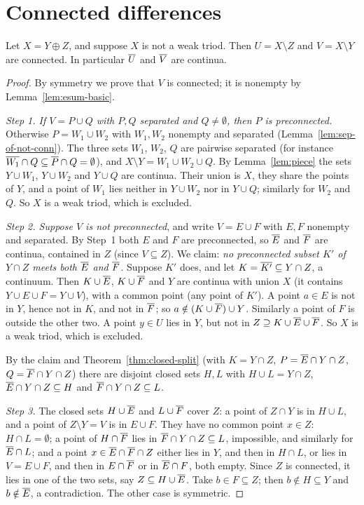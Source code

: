 \section{Connected differences}

\begin{theorem}\label{thm:diff-connected}
Let $X=Y\oplus Z$, and suppose $X$ is not a weak triod. Then $U=X\setminus Z$ and $V=X\setminus Y$ are
connected. In particular $\overline{U}$ and $\overline{V}$ are continua.
\end{theorem}

\begin{proof}
By symmetry we prove that $V$ is connected; it is nonempty by Lemma~\ref{lem:esum-basic}.

\emph{Step 1. If $V=P\cup Q$ with $P,Q$ separated and $Q\neq\emptyset$, then $P$ is preconnected.}
Otherwise $P=W_1\cup W_2$ with $W_1,W_2$ nonempty and separated (Lemma~\ref{lem:sep-of-not-conn}). The
three sets $W_1$, $W_2$, $Q$ are pairwise separated (for instance $\overline{W_1}\cap Q\subseteq\overline{P}\cap
Q=\emptyset$), and $X\setminus Y=W_1\cup W_2\cup Q$. By Lemma~\ref{lem:piece} the sets $Y\cup W_1$,
$Y\cup W_2$ and $Y\cup Q$ are continua. Their union is $X$, they share the points of $Y$, and a point
of $W_1$ lies neither in $Y\cup W_2$ nor in $Y\cup Q$; similarly for $W_2$ and $Q$. So $X$ is a weak
triod, which is excluded.

\emph{Step 2. Suppose $V$ is not preconnected}, and write $V=E\cup F$ with $E,F$ nonempty and
separated. By Step~1 both $E$ and $F$ are preconnected, so $\overline{E}$ and $\overline{F}$ are continua, contained
in $Z$ (since $V\subseteq Z$). We claim: \emph{no preconnected subset $K'$ of $Y\cap Z$ meets both
$\overline{E}$ and $\overline{F}$.} Suppose $K'$ does, and let $K=\overline{K'}\subseteq Y\cap Z$, a continuum. Then $K\cup\overline{E}$, $K\cup\overline{F}$ and $Y$ are continua with union $X$ (it contains $Y\cup E\cup F=Y\cup V$), with a common
point (any point of $K'$). A point $a\in E$ is not in $Y$, hence not in $K$, and not in $\overline{F}$; so
$a\notin(K\cup\overline{F})\cup Y$. Similarly a point of $F$ is outside the other two. A point $y\in U$ lies in
$Y$, but not in $Z\supseteq K\cup\overline{E}\cup\overline{F}$. So $X$ is a weak triod, which is excluded.

By the claim and Theorem~\ref{thm:closed-split} (with $K=Y\cap Z$, $P=\overline{E}\cap Y\cap Z$, $Q=\overline{F}\cap
Y\cap Z$) there are disjoint closed sets $H,L$ with $H\cup L=Y\cap Z$, $\overline{E}\cap Y\cap Z\subseteq H$ and
$\overline{F}\cap Y\cap Z\subseteq L$.

\emph{Step 3.} The closed sets $H\cup\overline{E}$ and $L\cup\overline{F}$ cover $Z$: a point of $Z\cap Y$ is in
$H\cup L$, and a point of $Z\setminus Y=V$ is in $E\cup F$. They have no common point $x\in Z$: $H\cap
L=\emptyset$; a point of $H\cap\overline{F}$ lies in $\overline{F}\cap Y\cap Z\subseteq L$, impossible, and similarly
for $\overline{E}\cap L$; and a point $x\in\overline{E}\cap\overline{F}\cap Z$ either lies in $Y$, and then in $H\cap L$, or
lies in $V=E\cup F$, and then in $E\cap\overline{F}$ or in $\overline{E}\cap F$, both empty. Since $Z$ is
connected, it lies in one of the two sets, say $Z\subseteq H\cup\overline{E}$. Take $b\in F\subseteq Z$; then
$b\notin H\subseteq Y$ and $b\notin\overline{E}$, a contradiction. The other case is symmetric.
\end{proof}

